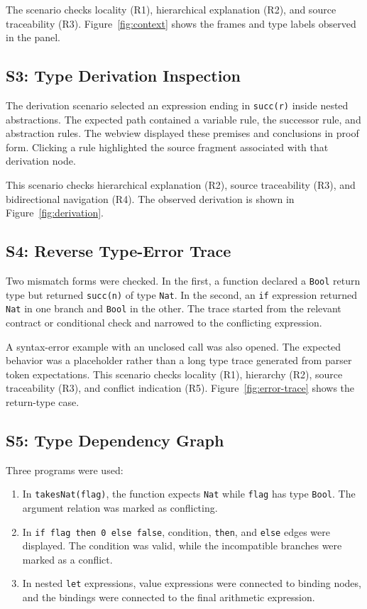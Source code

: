 The scenario checks locality (R1), hierarchical explanation (R2), and source traceability (R3). Figure~\ref{fig:context} shows the frames and type labels observed in the panel.

\subsection{S3: Type Derivation Inspection}

The derivation scenario selected an expression ending in \texttt{succ(r)} inside nested abstractions. The expected path contained a variable rule, the successor rule, and abstraction rules. The webview displayed these premises and conclusions in proof form. Clicking a rule highlighted the source fragment associated with that derivation node.

This scenario checks hierarchical explanation (R2), source traceability (R3), and bidirectional navigation (R4). The observed derivation is shown in Figure~\ref{fig:derivation}.

\subsection{S4: Reverse Type-Error Trace}

Two mismatch forms were checked. In the first, a function declared a \texttt{Bool} return type but returned \texttt{succ(n)} of type \texttt{Nat}. In the second, an \texttt{if} expression returned \texttt{Nat} in one branch and \texttt{Bool} in the other. The trace started from the relevant contract or conditional check and narrowed to the conflicting expression.

A syntax-error example with an unclosed call was also opened. The expected behavior was a placeholder rather than a long type trace generated from parser token expectations. This scenario checks locality (R1), hierarchy (R2), source traceability (R3), and conflict indication (R5). Figure~\ref{fig:error-trace} shows the return-type case.

\subsection{S5: Type Dependency Graph}

Three programs were used:

\begin{enumerate}
    \item In \texttt{takesNat(flag)}, the function expects \texttt{Nat} while \texttt{flag} has type \texttt{Bool}. The argument relation was marked as conflicting.
    \item In \texttt{if flag then 0 else false}, condition, \texttt{then}, and \texttt{else} edges were displayed. The condition was valid, while the incompatible branches were marked as a conflict.
    \item In nested \texttt{let} expressions, value expressions were connected to binding nodes, and the bindings were connected to the final arithmetic expression.
\end{enumerate}


